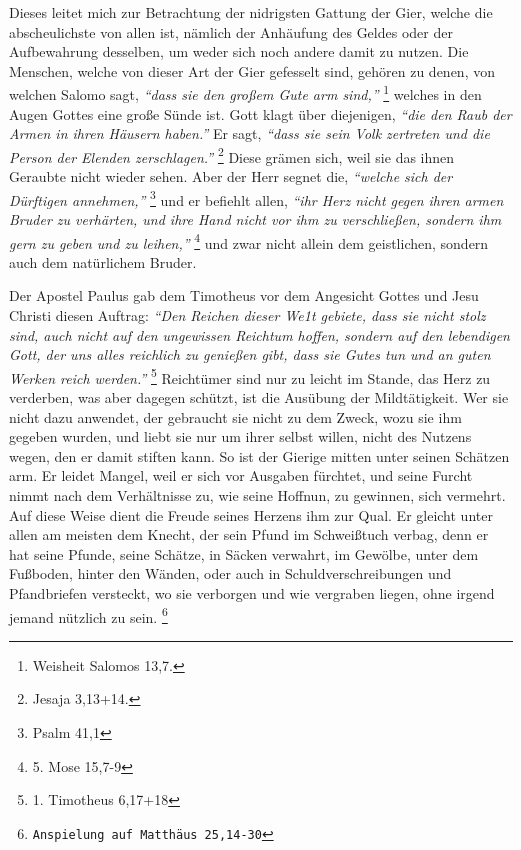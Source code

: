 Dieses leitet mich zur Betrachtung der nidrigsten Gattung der Gier, welche die
abscheulichste von allen ist, nämlich der Anhäufung des Geldes oder der
Aufbewahrung desselben, um weder sich noch andere damit zu nutzen. Die Menschen,
welche von dieser Art der Gier gefesselt sind, gehören zu denen, von welchen
Salomo sagt,
\textit{"`dass sie den großem Gute arm sind,"'}
\footnote{Weisheit Salomos 13,7.}
welches in den Augen Gottes eine große Sünde ist. Gott klagt
über diejenigen,
\textit{"`die den Raub der Armen in ihren Häusern haben."'} Er sagt,
\textit{"`dass sie sein Volk
zertreten und die Person der Elenden zerschlagen."'}
\footnote{Jesaja 3,13+14.}
Diese grämen sich, weil sie das ihnen Geraubte nicht wieder sehen. Aber der Herr
segnet die, \textit{"`welche sich der Dürftigen annehmen,"'}
\footnote{Psalm 41,1}
und er
befiehlt allen,
\textit{"`ihr Herz nicht gegen ihren armen Bruder zu verhärten, und ihre
Hand nicht vor ihm zu verschließen, sondern ihm gern zu geben und zu
leihen,"'}
\footnote{5. Mose 15,7-9}
und zwar nicht allein dem geistlichen,
sondern auch dem natürlichem Bruder.

\medskip

Der Apostel Paulus gab dem Timotheus vor dem Angesicht Gottes und Jesu Christi
diesen Auftrag:
\textit{"`Den Reichen dieser We1t gebiete, dass sie nicht stolz sind,
auch nicht auf den ungewissen Reichtum hoffen, sondern auf den lebendigen Gott,
der uns alles reichlich zu genießen gibt, dass sie Gutes tun und an guten
Werken reich werden."'}
\footnote{1. Timotheus 6,17+18}
Reichtümer sind nur zu leicht
im Stande, das Herz zu verderben, was aber
dagegen schützt, ist die Ausübung der
Mildtätigkeit. Wer sie nicht dazu anwendet, der gebraucht
sie nicht zu dem
Zweck, wozu sie ihm gegeben wurden, und liebt sie nur um ihrer selbst willen,
nicht des Nutzens wegen, den er damit stiften kann. So
ist der Gierige mitten
unter seinen Schätzen arm. Er leidet Mangel, weil er sich vor Ausgaben fürchtet,
und seine Furcht nimmt nach dem Verhältnisse zu, wie
seine Hoffnun, zu gewinnen,
sich vermehrt. Auf diese Weise dient die Freude seines Herzens ihm zur Qual. Er
gleicht unter allen am meisten dem Knecht, der sein Pfund im Schweißtuch
verbag, denn er hat seine Pfunde, seine Schätze, in Säcken verwahrt, im Gewölbe,
unter dem Fußboden, hinter den Wänden, oder auch in Schuldverschreibungen und
Pfandbriefen versteckt, wo sie verborgen und wie vergraben liegen, ohne irgend
jemand nützlich zu sein.
\footnote{\texttt{Anspielung auf Matthäus 25,14-30}}

